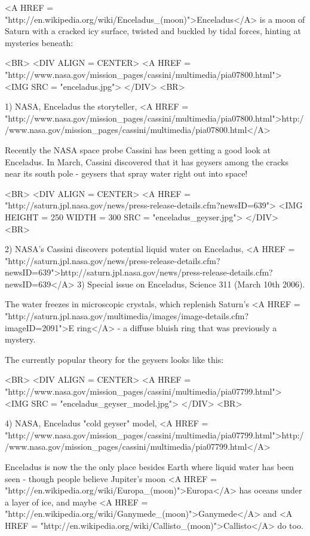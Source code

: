 

<A HREF = "http://en.wikipedia.org/wiki/Enceladus_(moon)">Enceladus</A> 
is a moon of Saturn with a cracked icy surface, twisted 
and buckled by tidal forces, hinting at mysteries beneath:

<BR>
<DIV ALIGN = CENTER>
<A HREF = "http://www.nasa.gov/mission_pages/cassini/multimedia/pia07800.html">
<IMG SRC = "enceladus.jpg">
</DIV>
<BR>

1) NASA, Enceladus the storyteller, 
<A HREF = "http://www.nasa.gov/mission_pages/cassini/multimedia/pia07800.html">http://www.nasa.gov/mission_pages/cassini/multimedia/pia07800.html</A>

Recently the NASA space probe Cassini has been getting a good look 
at Enceladus.  In March, Cassini discovered that it has geysers 
among the cracks near its south pole - 
geysers that spray water right out into space!

<BR>
<DIV ALIGN = CENTER>
<A HREF = "http://saturn.jpl.nasa.gov/news/press-release-details.cfm?newsID=639">
<IMG HEIGHT = 250 WIDTH = 300 SRC = "enceladus_geyser.jpg">
</DIV>
<BR>

2) NASA's Cassini discovers potential liquid water on Enceladus,
<A HREF = "http://saturn.jpl.nasa.gov/news/press-release-details.cfm?newsID=639">http://saturn.jpl.nasa.gov/news/press-release-details.cfm?newsID=639</A>
3) Special issue on Enceladus, Science 311 (March 10th 2006). 

The water freezes in microscopic crystals, which replenish Saturn's 
<A HREF = "http://saturn.jpl.nasa.gov/multimedia/images/image-details.cfm?imageID=2091">E ring</A> - a diffuse bluish ring that was previously a mystery.

The currently popular theory for the geysers looks like this:

<BR>
<DIV ALIGN = CENTER>
<A HREF = "http://www.nasa.gov/mission_pages/cassini/multimedia/pia07799.html">
<IMG SRC = "enceladus_geyser_model.jpg">
</DIV>
<BR>

4) NASA, Enceladus "cold geyser" model,
<A HREF = "http://www.nasa.gov/mission_pages/cassini/multimedia/pia07799.html">http://www.nasa.gov/mission_pages/cassini/multimedia/pia07799.html</A>

Enceladus is now the the only place besides Earth where liquid water
has been seen - though people believe Jupiter's moon 
<A HREF = "http://en.wikipedia.org/wiki/Europa_(moon)">Europa</A>
has oceans
under a layer of ice, and maybe 
<A HREF = "http://en.wikipedia.org/wiki/Ganymede_(moon)">Ganymede</A>
and 
<A HREF = "http://en.wikipedia.org/wiki/Callisto_(moon)">Callisto</A> 
do too.

